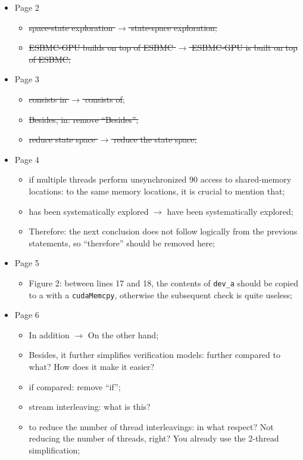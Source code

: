 \documentclass[12pt]{article}
\begin{document}
\begin{itemize}
\item Page 2
  \begin{itemize}
  \item \sout{space-state exploration $\rightarrow$ state-space exploration;}
  \item \sout{ESBMC-GPU builds on top of ESBMC $\rightarrow$ ESBMC-GPU is built on top of ESBMC;}
  \end{itemize}
\item Page 3
  \begin{itemize}
  \item \sout{consists in $\rightarrow$ consists of};
  \item \sout{Besides, in: remove ``Besides'';}
  \item \sout{reduce state space $\rightarrow$ reduce the state space;}
  \end{itemize}
\item Page 4
  \begin{itemize}
  \item if multiple threads perform unsynchronized 90 access to shared-memory locations: to the same memory locations, it is crucial to mention that;
  \item has been systematically explored $\rightarrow$ have been systematically explored;
  \item Therefore: the next conclusion does not follow logically from the previous statements, so ``therefore'' should be removed here;
  \end{itemize}
\item Page 5
  \begin{itemize}
  \item Figure 2: between lines 17 and 18, the contents of {\tt dev\_a} should be copied to a with a {\tt cudaMemcpy}, otherwise the subsequent check is quite useless;
  \end{itemize}
\item Page 6
  \begin{itemize}
  \item In addition $\rightarrow$ On the other hand;
  \item Besides, it further simplifies verification models: further compared to what? How does it make it easier?
  \item if compared: remove ``if'';
  \item stream interleaving: what is this?
  \item  to reduce the number of thread interleavings: in what respect? Not reducing the number of threads, right? You already use the 2-thread simplification;
  \end{itemize}
\end{itemize}
\end{document}
